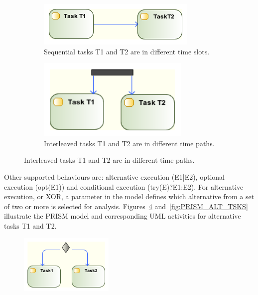 \begin{figure}
        \centering
        \begin{subfigure}[b]{0.4\textwidth}
                \includegraphics[width=\textwidth]{imgs/UML_SEQ_TSKS.png}
				\caption{Sequential tasks T1 and T2 are in different time slots.}
				\label{fig:UML_SEQ_TSKS}
        \end{subfigure}        
        \quad %
        \begin{subfigure}[b]{0.4\textwidth}                
                \includegraphics[width=0.8\textwidth]{imgs/UML_PAR_TSKS.png}
				\caption{Interleaved tasks T1 and T2 are in different time paths.}
				\label{fig:UML_PAR_TSKS}
        \end{subfigure}%
          
\end{figure}

Other supported behaviours are: alternative execution (E1|E2), optional execution (opt(E1)) and conditional execution (try(E)?E1:E2). For alternative execution, or XOR, a parameter in the model defines which alternative from a set of two or more is selected for analysis. Figures~\ref{fig:UML_ALT_TSKS} and~\ref{fig:PRISM_ALT_TSKS} illustrate the PRISM model and corresponding UML activities for alternative tasks T1 and T2.

\begin{figure}[ht]
\centering
\includegraphics[width=0.4\textwidth]{imgs/UML_ALT_TSKS.png}
\caption{}
\label{fig:UML_ALT_TSKS}
\end{figure}

